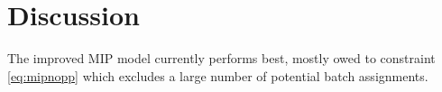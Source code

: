 \chapter{Discussion}\label{sec:discussion}
The improved MIP model currently performs best, mostly owed to constraint
\eqref{eq:mipnopp} which excludes a large number of potential batch assignments.

